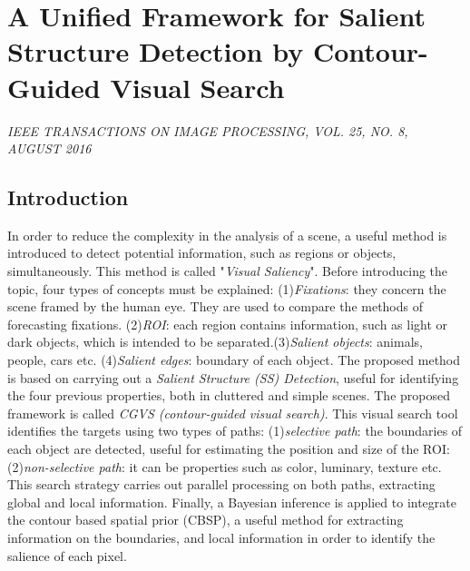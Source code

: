 \section{A Unified Framework for Salient Structure Detection by Contour-Guided Visual Search}

\begin{center}
    \author{
    Kai Fu Yang,
    Hui Li,
    Chao-Yi Li,
    and Young-Jie Li,
   \emph{Member}, 
    IEEE
}
\end{center}

\emph{IEEE TRANSACTIONS ON IMAGE PROCESSING, VOL. 25, NO. 8, AUGUST 2016}

\subsection{Introduction}
In order to reduce the complexity in the analysis of a scene, a useful method 
is introduced to detect potential information, such as regions or 
objects, simultaneously. This method is called "\emph{Visual Saliency}". Before introducing
the topic, four types of concepts must be explained: (1)\emph{Fixations}: 
they concern the scene framed by the human eye. They are used to compare 
the methods of forecasting fixations. (2)\emph{ROI}: each region contains information, 
such as light or dark objects, which is intended to be separated.(3)\emph{Salient objects}: 
animals, people, cars etc. (4)\emph{Salient edges}: boundary of each object. The proposed 
method is based on carrying out a \emph{Salient Structure (SS) Detection},
useful for identifying the four previous properties, both in cluttered and 
simple scenes. The proposed framework is called \emph{CGVS (contour-guided visual 
search)}. This visual search tool identifies the targets using two types of 
paths: (1)\emph{selective path}: the boundaries of each object are detected, useful 
for estimating the position and size of the ROI: (2)\emph{non-selective path}: it 
can be properties such as color, luminary, texture etc. This search strategy 
carries out parallel processing on both paths, extracting global and local 
information. Finally, a Bayesian inference is applied to integrate the contour 
based spatial prior (CBSP), a useful method for extracting information on 
the boundaries, and local information in order to identify the salience of each 
pixel. 
